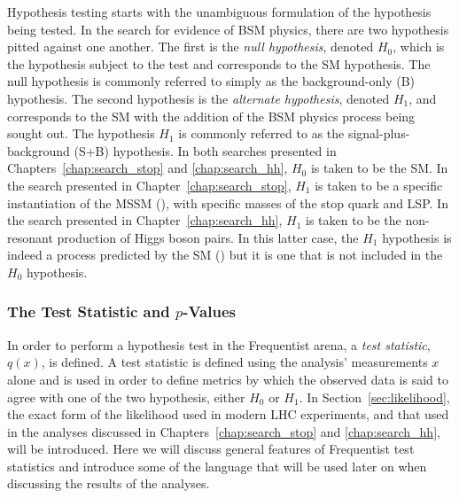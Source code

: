 Hypothesis testing starts with the unambiguous formulation of the hypothesis being
tested.
In the search for evidence of BSM physics, there are two hypothesis pitted
against one another.
The first is the \textit{null hypothesis}, denoted $H_0$, which is the hypothesis
subject to the test and corresponds to the SM hypothesis. The null hypothesis is commonly
referred to simply as the background-only (B) hypothesis.
The second hypothesis is the \textit{alternate hypothesis}, denoted $H_1$, and corresponds
to the SM with the addition of the BSM physics process being sought out.
The hypothesis $H_1$ is commonly referred to as the signal-plus-background (S+B) hypothesis.
In both searches presented in Chapters~\ref{chap:search_stop} and \ref{chap:search_hh},
$H_0$ is taken to be the SM.
In the search presented in Chapter~\ref{chap:search_stop}, $H_1$ is taken to be a specific
instantiation of the MSSM ({\color{red}{Section XXX}}), with specific masses of the
stop quark and LSP.
In the search presented in Chapter~\ref{chap:search_hh}, $H_1$ is taken to be the
non-resonant production of Higgs boson pairs.
In this latter case, the $H_1$ hypothesis is indeed a process predicted by the SM ({\color{red}{SECTION XXX about HH pheno and EWSB}}) but
it is one that is not included in the $H_0$ hypothesis.

%
%
\subsubsection{The Test Statistic and $p$-Values}

In order to perform a hypothesis test in the Frequentist arena, a \textit{test statistic}, $q(x)$,
is defined.
A test statistic is defined using the analysis' measurements $x$ alone and is
used in order to define metrics by which the observed data is said to agree with
one of the two hypothesis, either $H_0$ or $H_1$.
In Section~\ref{sec:likelihood}, the exact form of the likelihood used in modern LHC experiments,
and that used in the analyses discussed in Chapters~\ref{chap:search_stop} and \ref{chap:search_hh},
will be introduced.
Here we will discuss general features of Frequentist test statistics and introduce
some of the language that will be used later on when discussing the results of the
analyses.

